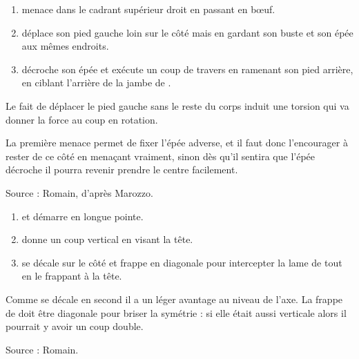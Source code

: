 \begin{technique}

\begin{enumerate}
	\item \A menace \D dans le cadrant supérieur droit en passant en bœuf.
	
	\item \A déplace son pied gauche loin sur le côté mais en gardant son buste et son épée aux mêmes endroits.
	
	\item \A décroche son épée et exécute un coup de travers en ramenant son pied arrière, en ciblant l'arrière de la jambe de \D.
\end{enumerate}

Le fait de déplacer le pied gauche sans le reste du corps induit une torsion qui va donner la force au coup en rotation.

La première menace permet de fixer l'épée adverse, et il faut donc l'encourager à rester de ce côté en menaçant vraiment, sinon dès qu'il sentira que l'épée décroche il pourra revenir prendre le centre facilement.

Source : Romain, d'après Marozzo.
\end{technique}


\begin{technique}

\begin{enumerate}
	\item \A et \D démarre en longue pointe.
	
	\item \A donne un coup vertical en visant la tête.
	
	\item \D se décale sur le côté et frappe en diagonale pour intercepter la lame de \A tout en le frappant à la tête.
\end{enumerate}

Comme \D se décale en second il a un léger avantage au niveau de l'axe.
La frappe de \D doit être diagonale pour briser la symétrie : si elle était aussi verticale alors il pourrait y avoir un coup double.

Source : Romain.
\end{technique}


